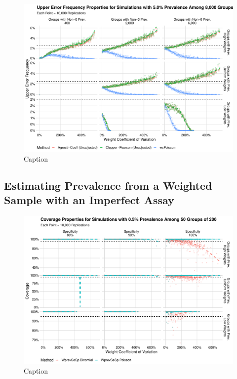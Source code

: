 \documentclass[AMA,STIX1COL]{WileyNJD-v2}
\begin{document}
\begin{figure}
    \centering
    \includegraphics[width=\textwidth]{figures/perfect_upper_error_frequency_8000_0_05_reduced.pdf}
    \caption{Caption}
    \label{fig:perfect_upper_error_frequency_8000_0_05_reduced.pdf}
\end{figure}

\subsection{Estimating Prevalence from a Weighted Sample with an  Imperfect Assay}

\begin{figure}
    \centering
    \includegraphics[width=\textwidth]{figures/imperfect_coverage_50_0_005_reduced.pdf}
    \caption{Caption}
    \label{fig:imperfect_coverage_50_0_005_reduced}
\end{figure}
\end{document}
